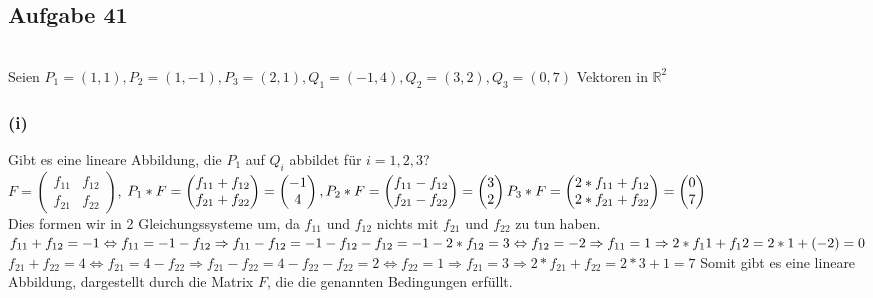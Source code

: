 \documentclass[12pt]{article}
\begin{document}
\subsection*{Aufgabe 41}\hfill\\
Seien $P_1=(1,1), P_2=(1,-1), P_3=(2,1), Q_1=(-1,4), Q_2=(3,2), Q_3=(0,7)$ Vektoren in $\mathbb{R}^2$
\subsubsection*{(i)}Gibt es eine lineare Abbildung, die $P_1$ auf $Q_i$ abbildet f{\"u}r $i=1,2,3$?\\
$F=\begin{pmatrix}
f_{11} & f_{12} \\ f_{21} & f_{22}
\end{pmatrix}$,
$P_1 * F = \begin{pmatrix}
f_{11}+f_{12}\\ f_{21}+f_{22}
\end{pmatrix} = 
\begin{pmatrix}
-1 \\ 4
\end{pmatrix}, 
P_2 * F = \begin{pmatrix}
f_{11}-f_{12}\\ f_{21}-f_{22}
\end{pmatrix} = 
\begin{pmatrix}
3 \\ 2
\end{pmatrix}\\
P_3 * F = \begin{pmatrix}
2*f_{11}+f_{12}\\ 2*f_{21}+f_{22}
\end{pmatrix} = 
\begin{pmatrix}
0 \\ 7
\end{pmatrix}$\\
Dies formen wir in 2 Gleichungssysteme um, da $f_{11}$ und $f_{12}$ nichts mit $f_{21}$ und $f_{22}$ zu tun haben.\\
$f_{11}+f_{12}= -1 \Leftrightarrow f_{11}=-1-f_{12} \Rightarrow f_{11}-f_{12}=-1-f_{12}-f_{12}= -1-2*f_{12}=3 \\\Leftrightarrow f_{12}=-2 \Rightarrow f_{11}=1 \Rightarrow 2*f_11+f_12=2*1+(-2)=0$\\
$f_{21}+f_{22}=4 \Leftrightarrow f_{21}=4-f_{22} \Rightarrow f_21-f_22= 4-f_{22}-f_{22}=2 \Leftrightarrow f_{22}=1 \Rightarrow f_{21}=3 \Rightarrow 2*f_{21}+f_{22} = 2*3+1=7$
Somit gibt es eine lineare Abbildung, dargestellt durch die Matrix $F$, die die genannten Bedingungen erf{\"u}llt.
\end{document}
